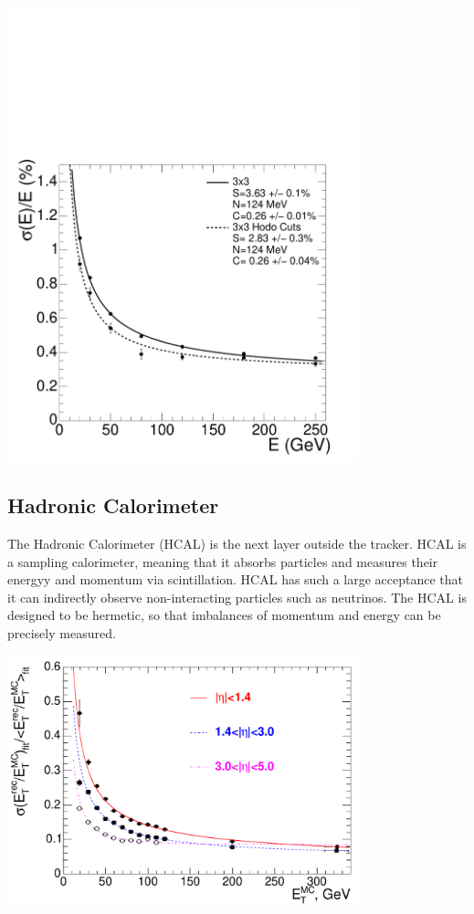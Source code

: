 \centerline{
\includegraphics[width=4in]{Chapter3/importfigs/Figure_001-007.pdf}
}
 
\subsection{Hadronic Calorimeter}

The Hadronic Calorimeter (HCAL) is the next layer outside the tracker. HCAL is a sampling calorimeter, meaning that it absorbs particles and measures their energyy and momentum via scintillation. HCAL has such a large acceptance that it can indirectly observe non-interacting particles such as neutrinos. The HCAL is designed to be hermetic, so that imbalances of momentum and energy can be precisely measured.

\centerline{
\includegraphics[width=4in]{Chapter3/importfigs/Figure_001-008.pdf}
}

